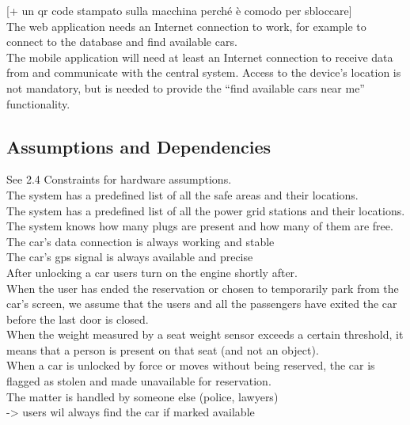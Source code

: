 \documentclass[english]{article}
\begin{document}
[+ un qr code stampato sulla macchina perché è comodo per sbloccare]\\


The web application needs an Internet connection to work, for example to connect to the database and find available cars.\\


The mobile application will need at least an Internet connection to receive data from and communicate with the central system. Access to the device’s location is not mandatory, but is needed to provide the “find available cars near me” functionality.\\

\subsection{Assumptions and Dependencies}

See 2.4 Constraints for hardware assumptions.\\


The system has a predefined list of all the safe areas and their locations.\\
The system has a predefined list of all the power grid stations and their locations.\\
The system knows how many plugs are present and how many of them are free.\\


The car’s data connection is always working and stable\\
The car’s gps signal is always available and precise\\


After unlocking a car users turn on the engine shortly after.\\


When the user has ended the reservation or chosen to temporarily park from the car’s screen, we assume that the users and all the passengers have exited the car before the last door is closed.\\


When the weight measured by a seat weight sensor exceeds a certain threshold, it means that a person is present on that seat (and not an object).\\


When a car is unlocked by force or moves without being reserved, the car is flagged as stolen and made unavailable for reservation. \\
The matter is handled by someone else (police, lawyers)\\
-> users wil always find the car if marked available\\
\end{document}
